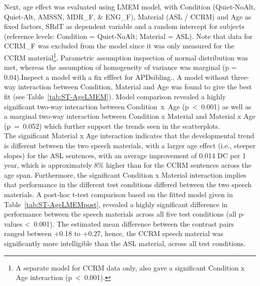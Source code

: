 \documentclass[a4paper, twoside]{templates/ociamthesis}
\begin{document}
Next, age effect was evaluated using LMEM model, with Condition (Quiet-NoAlt, Quiet-Alt, AMSSN, MDR\_F, \& ENG\_F), Material (ASL / CCRM) and Age as fixed factors, SRdT as dependent variable and a random intercept for subjects (reference levels: Condition = Quiet-NoAlt; Material = ASL). Note that data for CCRM\_F was excluded from the model since it was only measured for the CCRM material\footnote{A separate model for CCRM data only, also gave a significant Condition x Age interaction (p~\textless~0.001).}. Parametric assumption inspection of normal distribution was met, whereas the assumption of homogeneity of variance was marginal (p = 0.04).\colorbox[HTML]{CCCCFF}{Inspect a model with a fix efffect for APDsibling..} A model without three-way interaction between Condition, Material and Age was found to give the best fit (see Table~\ref{tab:ST-AgeLMEM}). Model comparison revealed a highly significant two-way interaction between Condition~x~Age (p~\textless~0.001) as well as a marginal two-way interaction between Condition x Material and Material x Age (p~=~0.052) which further support the trends seen in the scatterplots.\\

The significant Material x Age interaction indicates that the developmental trend is different between the two speech materials, with a larger age effect (i.e., steeper slopes) for the ASL sentences, with an average improvement of 0.014 DC per 1 year, which is approximately 8\% higher than for the CCRM sentences across the age span. Furthermore, the significant Condition x Material interaction implies that performance in the different test conditions differed between the two speech materials. A post-hoc t-test comparison based on the fitted model given in Table~\ref{tab:ST-AgeLMEMpost}, revealed a highly significant difference in performance between the speech materials across all five test conditions (all p-values \textless~0.001). The estimated mean difference between the contrast pairs ranged between +0.18 to +0.27, hence, the CCRM speech material was significantly more intelligible than the ASL material, across all test conditions.\\
\end{document}
